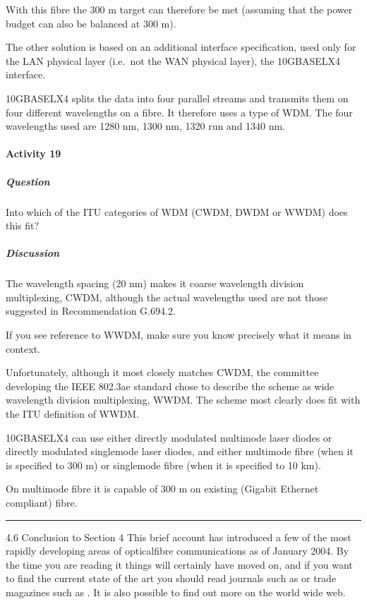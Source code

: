 \documentclass[letterpaper,10pt,english]{sphinxmanual}
\begin{document}
With this fibre the 300 m target can therefore be met (assuming that the power budget can also be balanced at 300 m).

The other solution is based on an additional interface specification, used only for the LAN physical layer (i.e. not the WAN physical layer), the 10GBASE\sphinxhyphen{}LX4 interface.

10GBASE\sphinxhyphen{}LX4 splits the data into four parallel streams and transmits them on four different wavelengths on a fibre. It therefore uses a type of WDM. The four wavelengths used are 1280 nm, 1300 nm, 1320 run and 1340 nm.


\paragraph{Activity 19}
\label{\detokenize{content/session_00/Part_00_04:Activity-19}}

\subparagraph{Question}
\label{\detokenize{content/session_00/Part_00_04:id16}}
Into which of the ITU categories of WDM (CWDM, DWDM or WWDM) does this fit?


\subparagraph{Discussion}
\label{\detokenize{content/session_00/Part_00_04:id17}}
The wavelength spacing (20 nm) makes it coarse wavelength division multiplexing, CWDM, although the actual wavelengths used are not those suggested in Recommendation G.694.2.

If you see reference to WWDM, make sure you know precisely what it means in context.

Unfortunately, although it most closely matches CWDM, the committee developing the IEEE 802.3ae standard chose to describe the scheme as wide wavelength division multiplexing, WWDM. The scheme most clearly does  fit with the ITU definition of WWDM.

10GBASE\sphinxhyphen{}LX4 can use either directly modulated multimode laser diodes or directly modulated single\sphinxhyphen{}mode laser diodes, and either multimode fibre (when it is specified to 300 m) or single\sphinxhyphen{}mode fibre (when it is specified to 10 km).

On multimode fibre it is capable of 300 m on existing (Gigabit Ethernet compliant) fibre.


\bigskip\hrule\bigskip


4.6 Conclusion to Section 4 This brief account has introduced a few of the most rapidly developing areas of optical\sphinxhyphen{}fibre communications as of January 2004. By the time you are reading it things will certainly have moved on, and if you want to find the current state of the art you should read journals such as  or trade magazines such as . It is also possible to find out more on the world wide web.
\end{document}
